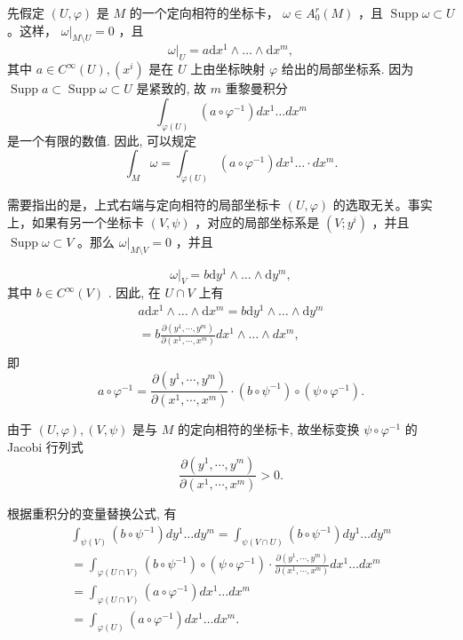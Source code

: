 先假定  $(U, \varphi)$  是  $M$  的一个定向相符的坐标卡， $\omega \in A_0^r(M)$ ，且  $\operatorname{Supp} \omega \subset U$ 。这样， $\omega|_{M \setminus U} = 0$ ，且
$$
\omega | _ {U} = a \mathrm {d} x ^ {1} \wedge \dots \wedge \mathrm {d} x ^ {m}, %
$$
其中  $a \in C^{\infty}(U), (x^{i})$  是在  $U$  上由坐标映射  $\varphi$  给出的局部坐标系. 因为  $\operatorname{Supp} a \subset \operatorname{Supp} \omega \subset U$  是紧致的, 故  $m$  重黎曼积分
$$
\int_ {\varphi (U)} \left(a \circ \varphi^ {- 1}\right) d x ^ {1} \dots d x ^ {m}
$$
是一个有限的数值. 因此, 可以规定
$$
\int_ {M} \omega = \int_ {\varphi (U)} \left(a \circ \varphi^ {- 1}\right) d x ^ {1} \dots \cdot d x ^ {m}. %
$$

需要指出的是，上式右端与定向相符的局部坐标卡  $(U, \varphi)$  的选取无关。事实上，如果有另一个坐标卡  $(V, \psi)$ ，对应的局部坐标系是  $(V; y^i)$ ，并且  $\operatorname{Supp} \omega \subset V$ 。那么  $\omega|_{M \setminus V} = 0$ ，并且

$$
\omega | _ {V} = b \mathrm {d} y ^ {1} \wedge \dots \wedge \mathrm {d} y ^ {m},
$$
其中  $b \in C^{\infty}(V)$ . 因此, 在  $U \cap V$  上有
$$
\begin{array}{l} a \mathrm {d} x ^ {1} \wedge \dots \wedge \mathrm {d} x ^ {m} = b \mathrm {d} y ^ {1} \wedge \dots \wedge \mathrm {d} y ^ {m} \\ = b \frac {\partial (y ^ {1} , \cdots , y ^ {m})}{\partial (x ^ {1} , \cdots , x ^ {m})} d x ^ {1} \wedge \dots \wedge d x ^ {m}, \\ \end{array}
$$
即
$$
a \circ \varphi^ {- 1} = \frac {\partial \left(y ^ {1} , \cdots , y ^ {m}\right)}{\partial \left(x ^ {1} , \cdots , x ^ {m}\right)} \cdot (b \circ \psi^ {- 1}) \circ (\psi \circ \varphi^ {- 1}). %
$$

由于  $(U, \varphi), (V, \psi)$  是与  $M$  的定向相符的坐标卡, 故坐标变换  $\psi \circ \varphi^{-1}$  的 Jacobi 行列式
$$
\frac {\partial \left(y ^ {1} , \cdots , y ^ {m}\right)}{\partial \left(x ^ {1} , \cdots , x ^ {m}\right)} > 0. %
$$

根据重积分的变量替换公式, 有
$$
\begin{array}{l} \int_ {\psi (V)} \left(b \circ \psi^ {- 1}\right) d y ^ {1} \dots d y ^ {m} = \int_ {\psi (V \cap U)} \left(b \circ \psi^ {- 1}\right) d y ^ {1} \dots d y ^ {m} \\ = \int_ {\varphi (U \cap V)} \left(b \circ \psi^ {- 1}\right) \circ \left(\psi \circ \varphi^ {- 1}\right) \cdot \frac {\partial \left(y ^ {1} , \cdots , y ^ {m}\right)}{\partial \left(x ^ {1} , \cdots , x ^ {m}\right)} d x ^ {1} \dots d x ^ {m} \\ = \int_ {\varphi (U \cap V)} \left(a \circ \varphi^ {- 1}\right) d x ^ {1} \dots d x ^ {m} \\ = \int_ {\varphi (U)} \left(a \circ \varphi^ {- 1}\right) d x ^ {1} \dots d x ^ {m}. %
 \\ \end{array}
$$

